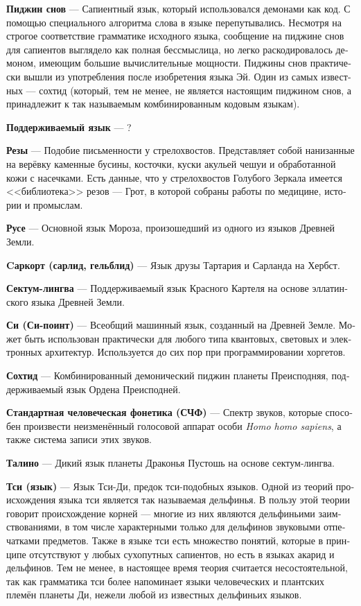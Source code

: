 \documentclass[a4paper,12pt,fleqn]{book}\usepackage{polyglossia}\setdefaultlanguage[babelshorthands=true]{russian}\setotherlanguage{english}\defaultfontfeatures{Ligatures=TeX,Mapping=tex-text}\usepackage{xcolor}\newcommand{\ml}[3]{#2}
\newcommand{\theterm}[3]{\textbf{\hypertarget{#1}{#2}} --- #3}
\begin{document}
\theterm{dream-pidgin}
{Пиджин снов}
{Сапиентный язык, который использовался демонами как код.
С помощью специального алгоритма слова в языке перепутывались.
Несмотря на строгое соответствие грамматике исходного языка, сообщение на пиджине снов для сапиентов выглядело как полная бессмыслица, но легко раскодировалось демоном, имеющим большие вычислительные мощности.
Пиджины снов практически вышли из употребления после изобретения языка Эй.
Один из самых известных --- сохтид (который, тем не менее, не является настоящим пиджином снов, а принадлежит к так называемым комбинированным кодовым языкам).}

\theterm{supported-language}
{Поддерживаемый язык}
{?}

\theterm{sketches}
{Резы}
{Подобие письменности у стрелохвостов.
Представляет собой нанизанные на верёвку каменные бусины, косточки, куски акульей чешуи и обработанной кожи с насечками.
Есть данные, что у стрелохвостов Голубого Зеркала имеется <<библиотека>> резов --- Грот, в которой собраны работы по медицине, истории и промыслам.}

\theterm{ruse}
{Русе}
{Основной язык Мороза, произошедший из одного из языков Древней Земли.}

\theterm{sarqort}
{Cаркорт (сарлид, гельблид)}
{Язык друзы Тартария и Сарланда на Хербст.}

\theterm{sectum-lingua}
{Сектум-лингва}
{Поддерживаемый язык Красного Картеля на основе эллатинского языка Древней Земли.}

\theterm{si}
{Си (Си-поинт)}
{Всеобщий машинный язык, созданный на Древней Земле.
Может быть использован практически для любого типа квантовых, световых и электронных архитектур.
Используется до сих пор при программировании хоргетов.}

\theterm{sojtid}
{Сохтид}
{Комбинированный демонический пиджин планеты Преисподняя, поддерживаемый язык Ордена Преисподней.}

\theterm{shp}
{Стандартная человеческая фонетика (СЧФ)}
{Спектр звуков, которые способен произвести неизменённый голосовой аппарат особи \textit{Homo homo sapiens}, а также система записи этих звуков.}

\theterm{talino}
{Талино}
{Дикий язык планеты Драконья Пустошь на основе сектум-лингва.}

\theterm{qi-language}
{Тси (язык)}
{Язык Тси-Ди, предок тси-подобных языков.
Одной из теорий происхождения языка тси является так называемая дельфинья.
В пользу этой теории говорит происхождение корней --- многие из них являются дельфиньими заимствованиями, в том числе характерными только для дельфинов звуковыми отпечатками предметов.
Также в языке тси есть множество понятий, которые в принципе отсутствуют у любых сухопутных сапиентов, но есть в языках акарид и дельфинов.
Тем не менее, в настоящее время теория считается несостоятельной, так как грамматика тси более напоминает языки человеческих и плантских племён планеты Ди, нежели любой из известных дельфиньих языков.}
\end{document}
